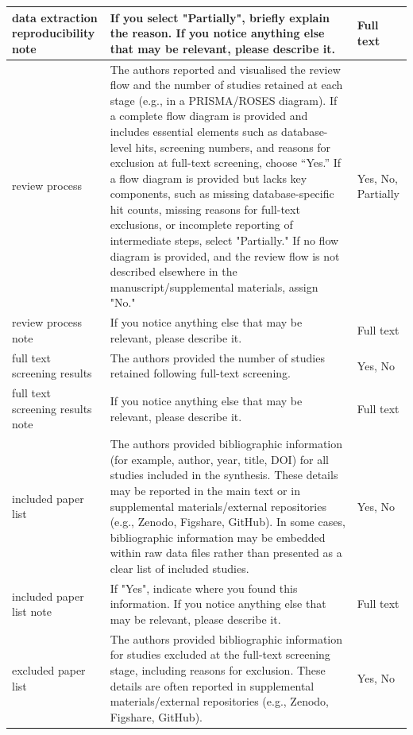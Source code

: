\documentclass{article}
\begin{document}
\begin{longtable}{p{2cm}|p{5.7cm}|p{2.75cm}}
        \hline
        data extraction reproducibility note & If you select "Partially", briefly explain the reason. If you notice anything else that may be relevant, please describe it. & Full text \\
        \hline
        review process & The authors reported and visualised the review flow and the number of studies retained at each stage (e.g., in a PRISMA/ROSES diagram). If a complete flow diagram is provided and includes essential elements such as database-level hits, screening numbers, and reasons for exclusion at full-text screening, choose “Yes.” If a flow diagram is provided but lacks key components, such as missing database-specific hit counts, missing reasons for full-text exclusions, or incomplete reporting of intermediate steps, select "Partially." If no flow diagram is provided, and the review flow is not described elsewhere in the manuscript/supplemental materials, assign "No." & Yes, No, Partially \\
        \hline
        review process note & If you notice anything else that may be relevant, please describe it. & Full text \\
        \hline
        full text screening results & The authors provided the number of studies retained following full-text screening. & Yes, No \\
        \hline
        full text screening results note & If you notice anything else that may be relevant, please describe it. & Full text \\
        \hline
        included paper list & The authors provided bibliographic information (for example, author, year, title, DOI) for all studies included in the synthesis. These details may be reported in the main text or in supplemental materials/external repositories (e.g., Zenodo, Figshare, GitHub). In some cases, bibliographic information may be embedded within raw data files rather than presented as a clear list of included studies. & Yes, No \\
        \hline
        included paper list note & If "Yes", indicate where you found this information. If you notice anything else that may be relevant, please describe it. & Full text \\
        \hline
        excluded paper list & The authors provided bibliographic information for studies excluded at the full-text screening stage, including reasons for exclusion. These details are often reported in supplemental materials/external repositories (e.g., Zenodo, Figshare, GitHub). & Yes, No \\

\end{longtable}
\end{document}

